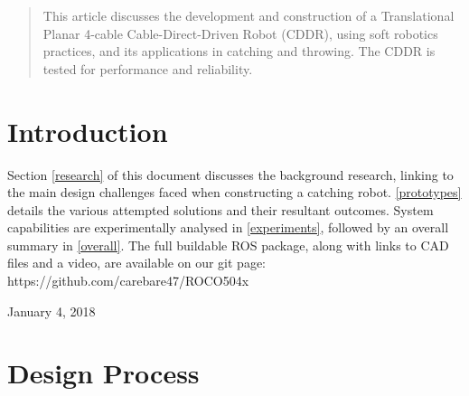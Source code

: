 \documentclass[conference]{IEEEtran}
\begin{document}
	
	
	
	
	
	
	
	\maketitle
	
	\begin{abstract}
This article discusses the development and construction of a Translational Planar 4-cable Cable-Direct-Driven Robot (CDDR), using soft robotics practices, and its applications in catching and throwing. The CDDR is tested for performance and reliability.
	\end{abstract}
	
	
	
	
	
	\IEEEpeerreviewmaketitle
	
	
	
	\section{Introduction}
Section \ref{research} of this document discusses the background research, linking to the main design challenges faced when constructing a catching robot. \ref{prototypes} details the various attempted solutions and their resultant outcomes. System capabilities are experimentally analysed in \ref{experiments}, followed by an overall summary in \ref{overall}. The full buildable ROS package, along with links to CAD files and a video, are available on our git page: https://github.com/carebare47/ROCO504x





\hfill January 4, 2018


\section{Design Process}
\end{document}
